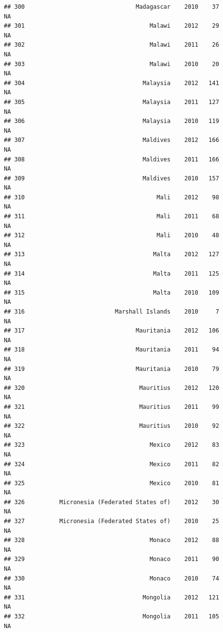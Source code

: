 \documentclass[
]{book}
\begin{document}
\begin{verbatim}
## 300                                Madagascar    2010    37              NA
## 301                                    Malawi    2012    29              NA
## 302                                    Malawi    2011    26              NA
## 303                                    Malawi    2010    20              NA
## 304                                  Malaysia    2012   141              NA
## 305                                  Malaysia    2011   127              NA
## 306                                  Malaysia    2010   119              NA
## 307                                  Maldives    2012   166              NA
## 308                                  Maldives    2011   166              NA
## 309                                  Maldives    2010   157              NA
## 310                                      Mali    2012    98              NA
## 311                                      Mali    2011    68              NA
## 312                                      Mali    2010    48              NA
## 313                                     Malta    2012   127              NA
## 314                                     Malta    2011   125              NA
## 315                                     Malta    2010   109              NA
## 316                          Marshall Islands    2010     7              NA
## 317                                Mauritania    2012   106              NA
## 318                                Mauritania    2011    94              NA
## 319                                Mauritania    2010    79              NA
## 320                                 Mauritius    2012   120              NA
## 321                                 Mauritius    2011    99              NA
## 322                                 Mauritius    2010    92              NA
## 323                                    Mexico    2012    83              NA
## 324                                    Mexico    2011    82              NA
## 325                                    Mexico    2010    81              NA
## 326          Micronesia (Federated States of)    2012    30              NA
## 327          Micronesia (Federated States of)    2010    25              NA
## 328                                    Monaco    2012    88              NA
## 329                                    Monaco    2011    90              NA
## 330                                    Monaco    2010    74              NA
## 331                                  Mongolia    2012   121              NA
## 332                                  Mongolia    2011   105              NA

\end{verbatim}
\end{document}
